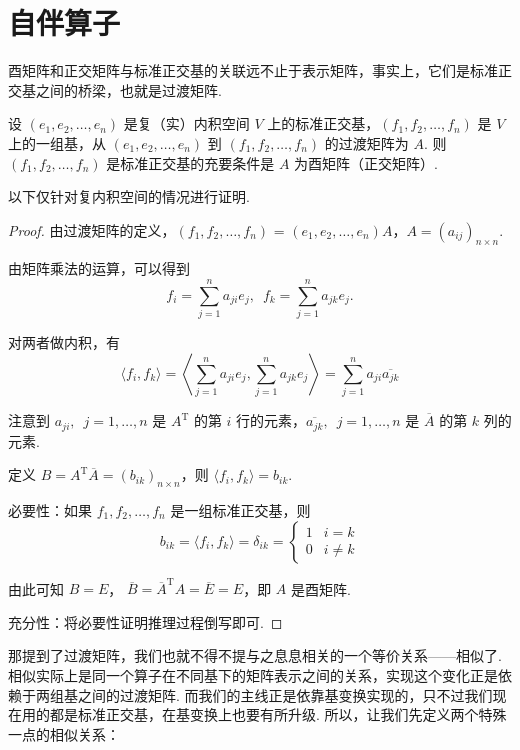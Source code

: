 \section{自伴算子}

酉矩阵和正交矩阵与标准正交基的关联远不止于表示矩阵，事实上，它们是标准正交基之间的桥梁，也就是过渡矩阵.

\begin{theorem}{}{}
    设 $ (e_1, e_2, \ldots , e_n) $ 是复（实）内积空间 $ V $ 上的标准正交基，$ (f_1, f_2, \ldots , f_n) $ 是 $ V $ 上的一组基，从 $ (e_1, e_2, \ldots , e_n) $ 到 $ (f_1, f_2, \ldots , f_n) $ 的过渡矩阵为 $ A $. 则 $ (f_1, f_2, \ldots , f_n) $ 是标准正交基的充要条件是 $ A $ 为酉矩阵（正交矩阵）.
\end{theorem}

以下仅针对复内积空间的情况进行证明.

\begin{proof}
    由过渡矩阵的定义，$ (f_1, f_2, \ldots , f_n) $ = $ (e_1, e_2, \ldots , e_n)A $，$ A = (a_{ij})_{n \times n} $.

    由矩阵乘法的运算，可以得到
    \[ f_i = \sum_{j = 1}^{n} a_{ji}e_j , \enspace f_k = \sum_{j = 1}^{n} a_{jk}e_j. \]

    对两者做内积，有
    \[ \langle f_i, f_k \rangle = \left\langle \sum_{j = 1}^{n} a_{ji}e_j, \sum_{j = 1}^{n} a_{jk}e_j \right\rangle = \sum_{j = 1}^{n} a_{ji}\overline{a_{jk}} \]

    注意到 $ a_{ji},\enspace j = 1, \ldots , n $ 是 $ A^{\mathrm{T}} $ 的第 $ i $ 行的元素，$ \overline{a_{jk}},\enspace j = 1, \ldots , n $ 是 $ \overline{A} $ 的第 $ k $ 列的元素.

    定义 $ B = A^{\mathrm{T}}\overline{A} = (b_{ik})_{n \times n} $，则 $ \langle f_i, f_k \rangle = b_{ik} $.

    必要性：如果 $ f_1, f_2, \ldots , f_n $ 是一组标准正交基，则
    \[b_{ik} = \langle f_i, f_k \rangle = \delta_{ik} =
        \begin{cases}
            1 & i = k    \\
            0 & i \neq k
        \end{cases}\]

    由此可知 $ B = E $， $ \overline{B} = \overline{A}^{\mathrm{T}} A = \overline{E} = E $，即 $ A $ 是酉矩阵.

    充分性：将必要性证明推理过程倒写即可.
\end{proof}

那提到了过渡矩阵，我们也就不得不提与之息息相关的一个等价关系——相似了. 相似实际上是同一个算子在不同基下的矩阵表示之间的关系，实现这个变化正是依赖于两组基之间的过渡矩阵. 而我们的主线正是依靠基变换实现的，只不过我们现在用的都是标准正交基，在基变换上也要有所升级. 所以，让我们先定义两个特殊一点的相似关系：

